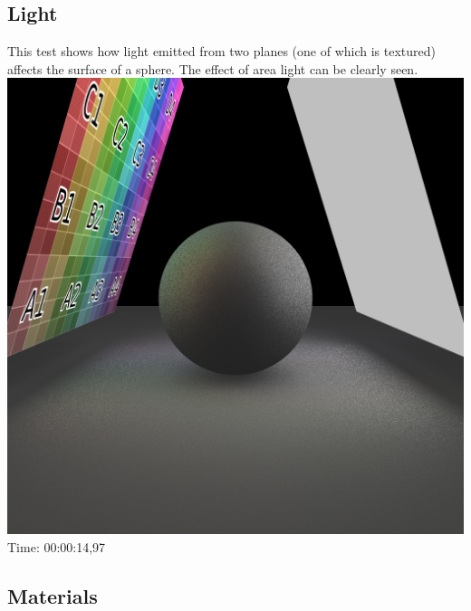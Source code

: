 \documentclass[12pt]{article} %
\begin{document}
\subsection{Light} 

This test shows how light emitted from two planes (one of which is textured) affects the surface of a sphere. The effect of area light can be clearly seen.\\
\includegraphics[width=\linewidth]{Homework4/tests/04_light.png}
Time: 00:00:14,97

\subsection{Materials} 
\end{document}
